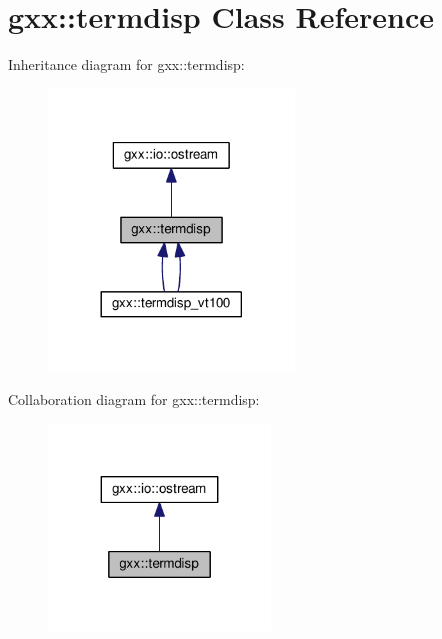 \hypertarget{classgxx_1_1termdisp}{}\section{gxx\+:\+:termdisp Class Reference}
\label{classgxx_1_1termdisp}


Inheritance diagram for gxx\+:\+:termdisp\+:
\nopagebreak
\begin{figure}[H]
\begin{center}
\leavevmode
\includegraphics[width=185pt]{classgxx_1_1termdisp__inherit__graph}
\end{center}
\end{figure}


Collaboration diagram for gxx\+:\+:termdisp\+:
\nopagebreak
\begin{figure}[H]
\begin{center}
\leavevmode
\includegraphics[width=167pt]{classgxx_1_1termdisp__coll__graph}
\end{center}
\end{figure}
